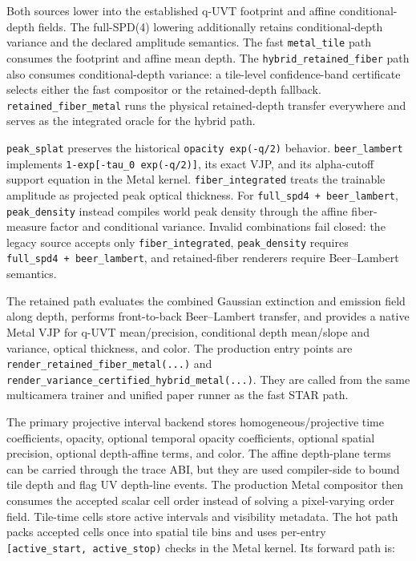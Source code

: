 \documentclass[
]{article}
\begin{document}
Both sources lower into the established q-UVT footprint and affine
conditional-depth fields. The full-SPD(4) lowering additionally retains
conditional-depth variance and the declared amplitude semantics. The
fast \texttt{metal\_tile} path consumes the footprint and affine mean
depth. The \texttt{hybrid\_retained\_fiber} path also consumes
conditional-depth variance: a tile-level confidence-band certificate
selects either the fast compositor or the retained-depth fallback.
\texttt{retained\_fiber\_metal} runs the physical retained-depth
transfer everywhere and serves as the integrated oracle for the hybrid
path.

\texttt{peak\_splat} preserves the historical
\texttt{opacity\ exp(-q/2)} behavior. \texttt{beer\_lambert} implements
\texttt{1-exp{[}-tau\_0\ exp(-q/2){]}}, its exact VJP, and its
alpha-cutoff support equation in the Metal kernel.
\texttt{fiber\_integrated} treats the trainable amplitude as projected
peak optical thickness. For \texttt{full\_spd4\ +\ beer\_lambert},
\texttt{peak\_density} instead compiles world peak density through the
affine fiber-measure factor and conditional variance. Invalid
combinations fail closed: the legacy source accepts only
\texttt{fiber\_integrated}, \texttt{peak\_density} requires
\texttt{full\_spd4\ +\ beer\_lambert}, and retained-fiber renderers
require Beer--Lambert semantics.

The retained path evaluates the combined Gaussian extinction and
emission field along depth, performs front-to-back Beer--Lambert
transfer, and provides a native Metal VJP for q-UVT mean/precision,
conditional depth mean/slope and variance, optical thickness, and color.
The production entry points are
\texttt{render\_retained\_fiber\_metal(...)} and
\texttt{render\_variance\_certified\_hybrid\_metal(...)}. They are
called from the same multicamera trainer and unified paper runner as the
fast STAR path.

The primary projective interval backend stores homogeneous/projective
time coefficients, opacity, optional temporal opacity coefficients,
optional spatial precision, optional depth-affine terms, and color. The
affine depth-plane terms can be carried through the trace ABI, but they
are used compiler-side to bound tile depth and flag UV depth-line
events. The production Metal compositor then consumes the accepted
scalar cell order instead of solving a pixel-varying order field.
Tile-time cells store active intervals and visibility metadata. The hot
path packs accepted cells once into spatial tile bins and uses per-entry
\texttt{{[}active\_start,\ active\_stop)} checks in the Metal kernel.
Its forward path is:
\end{document}

